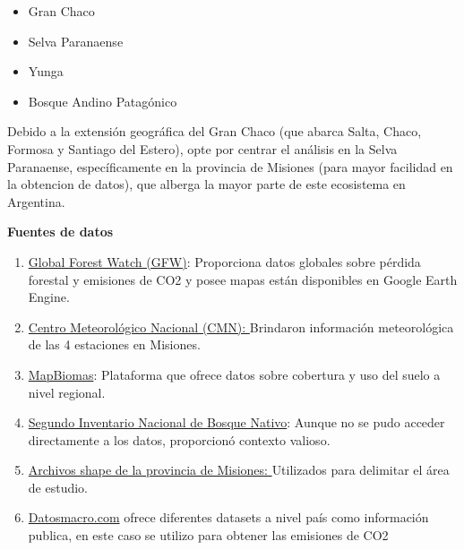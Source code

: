 \documentclass[11pt]{article}
\begin{document}
\begin{itemize}
    \item Gran Chaco
    \item Selva Paranaense
    \item Yunga
    \item Bosque Andino Patagónico

\end{itemize}

Debido a la extensión geográfica del Gran Chaco (que abarca Salta, Chaco, Formosa y Santiago del Estero), opte por centrar el análisis en la Selva Paranaense, específicamente en la provincia de Misiones (para mayor facilidad en la obtencion de datos), que alberga la mayor parte de este ecosistema en Argentina.

\textbf{Fuentes de datos}
\begin{enumerate}
    \item \href{https://www.globalforestwatch.org}{Global Forest Watch (GFW)}: Proporciona datos globales sobre pérdida forestal y emisiones de CO2 y posee mapas están disponibles en Google Earth Engine.
    \item \href{https://www.smn.gob.ar/}{Centro Meteorológico Nacional (CMN): } Brindaron información meteorológica de las 4 estaciones en Misiones.
    \item \href{https://plataforma.argentina.mapbiomas.org/cobertura?activeBaseMap=9&layersOpacity=100&activeModule=coverage&activeModuleContent=coverage%3Acoverage_main&activeYear=2022&mapPosition=-26.504989%2C-55.085449%2C7&timelineLimitsRange=1998%2C2022&baseParams[territoryType]=2&baseParams[territories]=3%3BMisiones%3B2%3BProvincia%3B-28.16422277099997%3B-56.05864361999994%3B-25.49431473599998%3B-53.63738317999997&baseParams[activeClassTreeOptionValue]=default&baseParams[activeClassTreeNodeIds]=1%2C2%2C4%2C5%2C6%2C3&baseParams[activeSubmodule]=coverage_main}{MapBiomas}: Plataforma que ofrece datos sobre cobertura y uso del suelo a nivel regional.
    \item \href{https://www.argentina.gob.ar/ambiente/bosques/segundo-inventario-nacional-bosques-nativos}{Segundo Inventario Nacional de Bosque Nativo}: Aunque no se pudo acceder directamente a los datos, proporcionó contexto valioso.
    \item \href{https://www.argentina.gob.ar/ambiente/bosques/segundo-inventario-nacional-bosques-nativos}{Archivos shape  de la provincia de Misiones: }Utilizados para delimitar el área de estudio.
    \item \href{https://datosmacro.expansion.com/energia-y-medio-ambiente/emisiones-co2/argentina}{Datosmacro.com} ofrece diferentes datasets a nivel país como información publica, en este caso se utilizo para obtener las emisiones de CO2
\end{enumerate}
\end{document}
